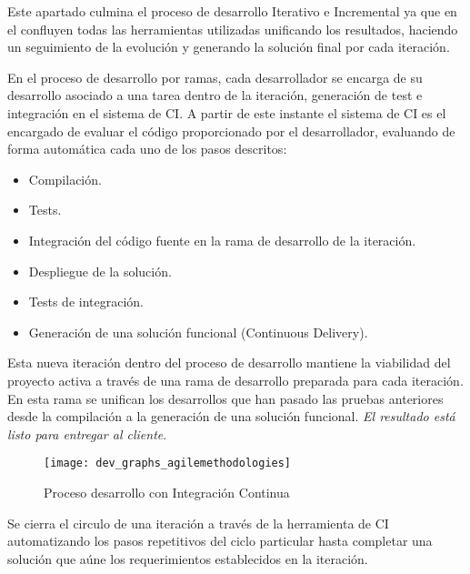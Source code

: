 \par Este apartado culmina el proceso de desarrollo Iterativo e Incremental ya que en el confluyen todas las herramientas utilizadas unificando los resultados, haciendo un seguimiento de la evolución y generando la solución final por cada iteración.

\par En el proceso de desarrollo por ramas, cada desarrollador se encarga de su desarrollo asociado a una tarea dentro de la iteración, generación de test e integración en el sistema de CI. A partir de este instante el sistema de CI es el encargado de evaluar el código proporcionado por el desarrollador, evaluando de forma automática cada uno de los pasos descritos:

\begin{itemize}
	\item Compilación.
	\item Tests.
	\item Integración del código fuente en la rama de desarrollo de la iteración.
	\item Despliegue de la solución.
	\item Tests de integración.
	\item Generación de una solución funcional (Continuous Delivery).
\end{itemize}

\par Esta nueva iteración dentro del proceso de desarrollo mantiene la viabilidad del proyecto activa a través de una rama de desarrollo preparada para cada iteración. En esta rama se unifican los desarrollos que han pasado las pruebas anteriores desde la compilación a la generación de una solución funcional. \emph{El resultado está listo para entregar al cliente}.

\begin{figure}[H]
    \centering
    \texttt{[image: dev\_graphs\_agilemethodologies]}
    \caption{Proceso desarrollo con Integración Continua}
    \label{fig:dev_graphs_agilemethodologies}
\end{figure}

\par Se cierra el circulo de una iteración a través de la herramienta de CI automatizando los pasos repetitivos del ciclo particular hasta completar una solución que aúne los requerimientos establecidos en la iteración.


